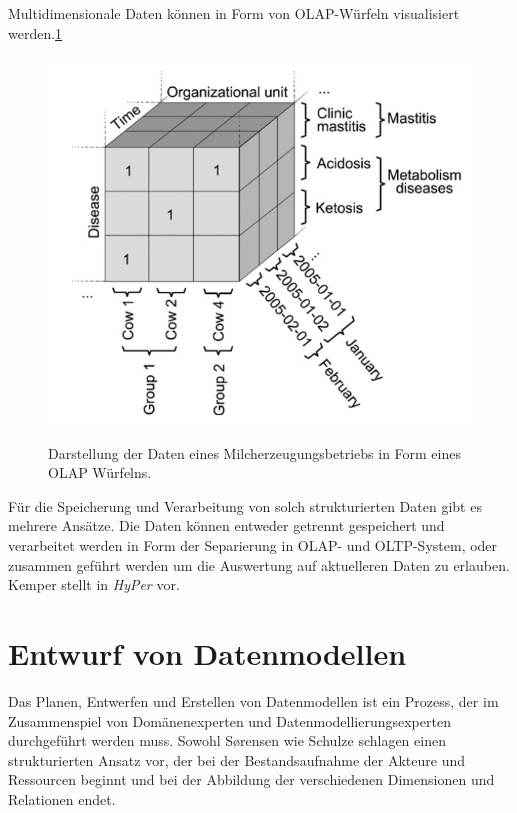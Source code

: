 Multidimensionale Daten können in Form von OLAP-Würfeln visualisiert werden.\ref{fig:kuehe_olap} 

\begin{figure}[h]
 \includegraphics[scale=0.5,natwidth=\textwidth]{figures/datamodelling/kuehe_olap_wuerfel_schulze2007.png}
 \centering
 \label{fig:kuehe_olap}
 \caption{Darstellung der Daten eines Milcherzeugungsbetriebs in Form eines OLAP Würfelns.\cite{jour:Schulze2007}}
\end{figure}

Für die Speicherung und Verarbeitung von solch strukturierten Daten gibt es mehrere Ansätze. Die Daten können entweder getrennt gespeichert und verarbeitet werden in Form der Separierung in OLAP- und OLTP-System, oder zusammen geführt werden um die Auswertung auf aktuelleren Daten zu erlauben. Kemper stellt in \cite{jour:Kemper2011} \textit{HyPer} vor.

\section{Entwurf von Datenmodellen}
Das Planen, Entwerfen und Erstellen von Datenmodellen ist ein Prozess, der im Zusammenspiel von Domänenexperten und Datenmodellierungsexperten durchgeführt werden muss. Sowohl S\o rensen wie Schulze schlagen einen strukturierten Ansatz vor, der bei der Bestandsaufnahme der Akteure und Ressourcen beginnt und bei der Abbildung der verschiedenen Dimensionen und Relationen endet.\cite{jour:Schulze2007}\cite{jour:Sorensen2010}

